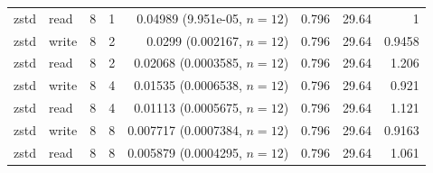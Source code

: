 {\begin{longtable}{@{}llrrrrrr@{}}
zstd & read & 8 & 1 & 0.04989 (9.951e-05, $n{=}12$) & 0.796 & 29.64 & 1 \\
zstd & write & 8 & 2 & 0.0299 (0.002167, $n{=}12$) & 0.796 & 29.64 & 0.9458 \\
zstd & read & 8 & 2 & 0.02068 (0.0003585, $n{=}12$) & 0.796 & 29.64 & 1.206 \\
zstd & write & 8 & 4 & 0.01535 (0.0006538, $n{=}12$) & 0.796 & 29.64 & 0.921 \\
zstd & read & 8 & 4 & 0.01113 (0.0005675, $n{=}12$) & 0.796 & 29.64 & 1.121 \\
zstd & write & 8 & 8 & 0.007717 (0.0007384, $n{=}12$) & 0.796 & 29.64 & 0.9163 \\
zstd & read & 8 & 8 & 0.005879 (0.0004295, $n{=}12$) & 0.796 & 29.64 & 1.061 \\
\bottomrule
\end{longtable}
}

\begin{table}[tbp]
\centering
\scriptsize
\caption{CON-bin of the million-atom frame, through \texttt{write\_conbin} and \texttt{read\_conbin}. The write unlinks the destination before the clock. Time is the type-7 median in seconds, the interquartile range, and $n$. Host from lscpu: Intel(R) Xeon(R) Processor, family 6, model 173, 8 CPUs.}
\label{tab:camp16b-conbin}
\end{table}
